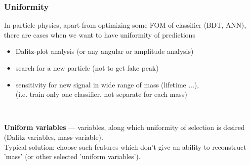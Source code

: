 \documentclass{beamer}
\begin{document}
\begin{frame}
    \frametitle{Uniformity}
    In particle physics, apart from optimizing some FOM of classifier (BDT, ANN), 
    there are cases when we want to have uniformity of predictions
    \begin{itemize}
    \item Dalitz-plot analysis (or any angular or amplitude analysis)

    \item search for a new particle (not to get fake peak)

    \item sensitivity for new signal 
        in wide range of mass (lifetime ...), \\
        ({\small i.e. train only one classifier, not separate for each mass})

    \end{itemize}
    $ $

    \textbf{Uniform variables} --- variables, along which uniformity of selection is desired (Dalitz variables, mass variable).
    \bigskip \\
    Typical solution: choose such features which don't give an ability to reconstruct 'mass' (or other selected 'uniform variables').
\end{frame}
\end{document}
